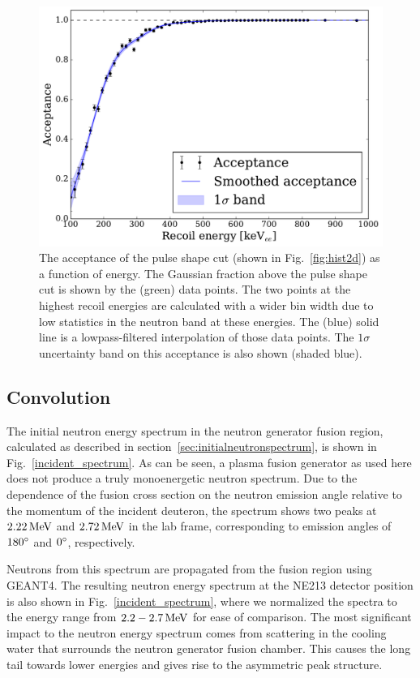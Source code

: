 \begin{figure}[!htbp]
\centering
    \includegraphics[height=1\textheight]{figures/ng/acceptance}
    \caption{The acceptance of the pulse shape cut (shown in Fig.~\ref{fig:hist2d}) as a function of energy. The Gaussian fraction above the pulse shape cut is shown by the (green) data points. The two points at the highest recoil energies are calculated with a wider bin width due to low statistics in the neutron band at these energies. The (blue) solid line is a lowpass-filtered interpolation of those data points. The $1\sigma$ uncertainty band on this acceptance is also shown (shaded blue).}
    \label{fig:acceptance}
\end{figure}

\subsection{Convolution}\label{sec:convolution}

The initial neutron energy spectrum in the neutron generator fusion region, calculated as described in section~\ref{sec:initialneutronspectrum}, is shown in Fig.~\ref{incident_spectrum}. As can be seen, a plasma fusion generator as used here does not produce a truly monoenergetic neutron spectrum. Due to the dependence of the fusion cross section on the neutron emission angle relative to the momentum of the incident deuteron, the spectrum shows two peaks at $2.22\,\mathrm{MeV}$ and $2.72\,\mathrm{MeV}$ in the lab frame, corresponding to emission angles of $180{}^{\circ}$ and $0{}^{\circ}$, respectively.

Neutrons from this spectrum are propagated from the fusion region using GEANT4. The resulting neutron energy spectrum at the NE213 detector position is also shown in Fig.~\ref{incident_spectrum}, where we normalized the spectra to the energy range from $2.2 - 2.7\,\mathrm{MeV}$ for ease of comparison. The most significant impact to the neutron energy spectrum comes from scattering in the cooling water that surrounds the neutron generator fusion chamber. This causes the long tail towards lower energies and gives rise to the asymmetric peak structure.

